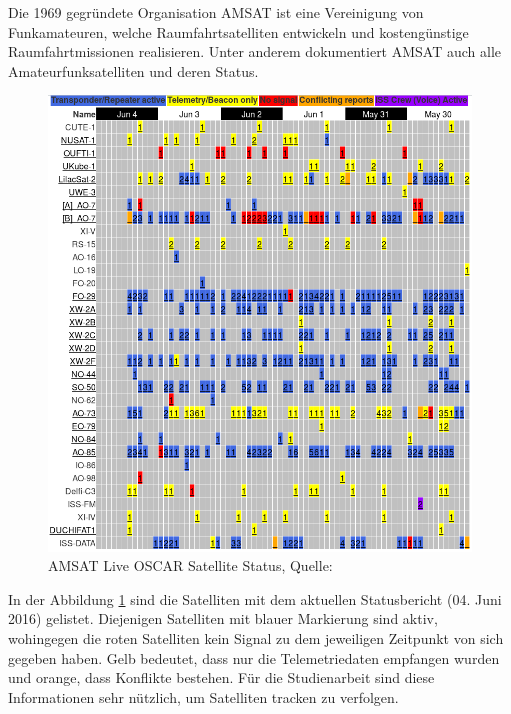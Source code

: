 \newpage
Die 1969 gegründete Organisation AMSAT ist eine Vereinigung von Funkamateuren, welche Raumfahrtsatelliten entwickeln und kostengünstige 
Raumfahrtmissionen realisieren. Unter anderem dokumentiert AMSAT auch alle Amateurfunksatelliten und deren Status. 
\begin{figure}[h]
 \centering
 \includegraphics[width=0.65\linewidth]{./images/amsatlist}
 \caption{AMSAT Live OSCAR Satellite Status, Quelle: \cite{amsat}}
 \label{fig:amsat}
\end{figure}
In der Abbildung \ref{fig:amsat} sind die Satelliten mit dem aktuellen Statusbericht (04. Juni 2016) gelistet. Diejenigen Satelliten mit blauer 
Markierung sind aktiv, wohingegen die roten Satelliten kein Signal zu dem jeweiligen Zeitpunkt von sich gegeben haben. Gelb bedeutet, dass nur die 
Telemetriedaten empfangen wurden und orange, dass Konflikte bestehen. Für die Studienarbeit sind diese Informationen sehr nützlich, um Satelliten 
tracken zu verfolgen. 
